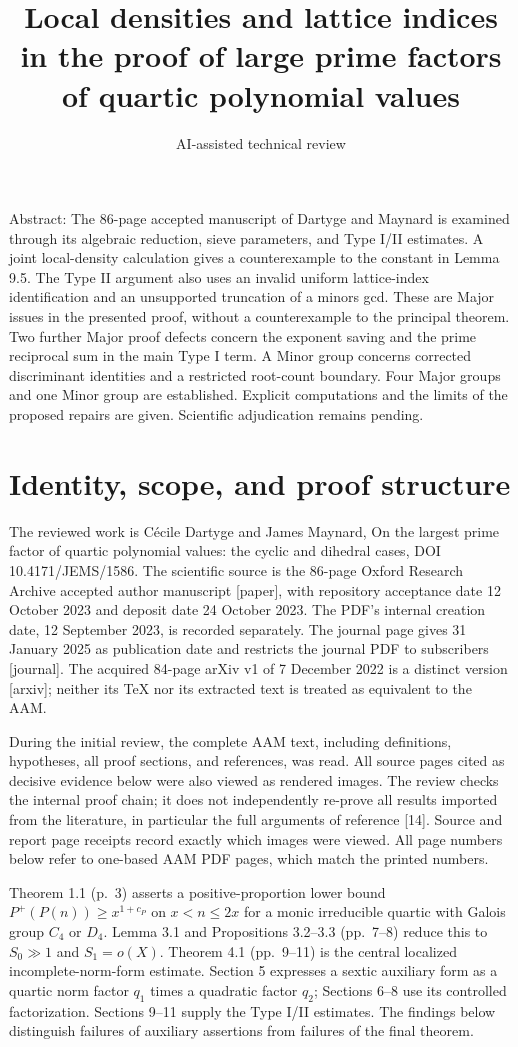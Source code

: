 \documentclass[10pt]{article}
\title{Local densities and lattice indices in the proof of large prime factors of quartic polynomial values}
\author{AI-assisted technical review}
\date{}
\begin{document}
\maketitle
Abstract: The 86-page accepted manuscript of Dartyge and Maynard is examined through its algebraic reduction, sieve parameters, and Type I/II estimates. A joint local-density calculation gives a counterexample to the constant in Lemma 9.5. The Type II argument also uses an invalid uniform lattice-index identification and an unsupported truncation of a minors gcd. These are Major issues in the presented proof, without a counterexample to the principal theorem. Two further Major proof defects concern the exponent saving and the prime reciprocal sum in the main Type I term. A Minor group concerns corrected discriminant identities and a restricted root-count boundary. Four Major groups and one Minor group are established. Explicit computations and the limits of the proposed repairs are given. Scientific adjudication remains pending.\par
\section*{Identity, scope, and proof structure}
The reviewed work is Cécile Dartyge and James Maynard, On the largest prime factor of quartic polynomial values: the cyclic and dihedral cases, DOI 10.4171/JEMS/1586. The scientific source is the 86-page Oxford Research Archive accepted author manuscript [paper], with repository acceptance date 12 October 2023 and deposit date 24 October 2023. The PDF’s internal creation date, 12 September 2023, is recorded separately. The journal page gives 31 January 2025 as publication date and restricts the journal PDF to subscribers [journal]. The acquired 84-page arXiv v1 of 7 December 2022 is a distinct version [arxiv]; neither its TeX nor its extracted text is treated as equivalent to the AAM.\par
During the initial review, the complete AAM text, including definitions, hypotheses, all proof sections, and references, was read. All source pages cited as decisive evidence below were also viewed as rendered images. The review checks the internal proof chain; it does not independently re-prove all results imported from the literature, in particular the full arguments of reference [14]. Source and report page receipts record exactly which images were viewed. All page numbers below refer to one-based AAM PDF pages, which match the printed numbers.\par
Theorem 1.1 (p. 3) asserts a positive-proportion lower bound \(P^+(P(n))\ge x^{1+c_P}\) on \(x<n\le2x\) for a monic irreducible quartic with Galois group \(C_4\) or \(D_4\). Lemma 3.1 and Propositions 3.2–3.3 (pp. 7–8) reduce this to \(S_0\gg1\) and \(S_1=o(X)\). Theorem 4.1 (pp. 9–11) is the central localized incomplete-norm-form estimate. Section 5 expresses a sextic auxiliary form as a quartic norm factor \(q_1\) times a quadratic factor \(q_2\); Sections 6–8 use its controlled factorization. Sections 9–11 supply the Type I/II estimates. The findings below distinguish failures of auxiliary assertions from failures of the final theorem.\par
\end{document}
